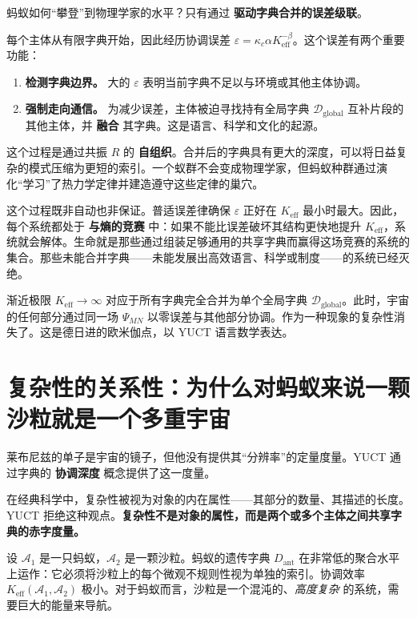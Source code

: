 \documentclass[12pt,a4paper]{article}
\newcommand{\Keff}{K_{\mathrm{eff}}}
\begin{document}
	蚂蚁如何“攀登”到物理学家的水平？只有通过 \textbf{驱动字典合并的误差级联}。
	
	每个主体从有限字典开始，因此经历协调误差 \(\varepsilon = \kappa_c \alpha \Keff^{-\beta}\)。这个误差有两个重要功能：
	
	\begin{enumerate}[leftmargin=*]
		\item \textbf{检测字典边界。} 大的 \(\varepsilon\) 表明当前字典不足以与环境或其他主体协调。
		\item \textbf{强制走向通信。} 为减少误差，主体被迫寻找持有全局字典 \(\mathcal{D}_{\text{global}}\) 互补片段的其他主体，并 \textbf{融合} 其字典。这是语言、科学和文化的起源。
	\end{enumerate}
	
	这个过程是通过共振 \(R\) 的 \textbf{自组织}。合并后的字典具有更大的深度，可以将日益复杂的模式压缩为更短的索引。一个蚁群不会变成物理学家，但蚂蚁种群通过演化“学习”了热力学定律并建造遵守这些定律的巢穴。
	
	这个过程既非自动也非保证。普适误差律确保 \(\varepsilon\) 正好在 \(\Keff\) 最小时最大。因此，每个系统都处于 \textbf{与熵的竞赛} 中：如果不能比误差破坏其结构更快地提升 \(\Keff\)，系统就会解体。生命就是那些通过组装足够通用的共享字典而赢得这场竞赛的系统的集合。那些未能合并字典——未能发展出高效语言、科学或制度——的系统已经灭绝。
	
	渐近极限 \(\Keff \to \infty\) 对应于所有字典完全合并为单个全局字典 \(\mathcal{D}_{\text{global}}\)。此时，宇宙的任何部分通过同一场 \(\Psi_{MN}\) 以零误差与其他部分协调。作为一种现象的复杂性消失了。这是德日进的欧米伽点，以 YUCT 语言数学表达。
	
	\section{复杂性的关系性：为什么对蚂蚁来说一颗沙粒就是一个多重宇宙}
	\label{sec:relational-complexity}
	
	莱布尼兹的单子是宇宙的镜子，但他没有提供其“分辨率”的定量度量。YUCT 通过字典的 \textbf{协调深度} 概念提供了这一度量。
	
	在经典科学中，复杂性被视为对象的内在属性——其部分的数量、其描述的长度。YUCT 拒绝这种观点。\textbf{复杂性不是对象的属性，而是两个或多个主体之间共享字典的赤字度量。}
	
	设 \(\mathcal{A}_1\) 是一只蚂蚁，\(\mathcal{A}_2\) 是一颗沙粒。蚂蚁的遗传字典 \(D_{\text{ant}}\) 在非常低的聚合水平上运作：它必须将沙粒上的每个微观不规则性视为单独的索引。协调效率 \(\Keff(\mathcal{A}_1, \mathcal{A}_2)\) 极小。对于蚂蚁而言，沙粒是一个混沌的、\emph{高度复杂} 的系统，需要巨大的能量来导航。
	
\end{document}
